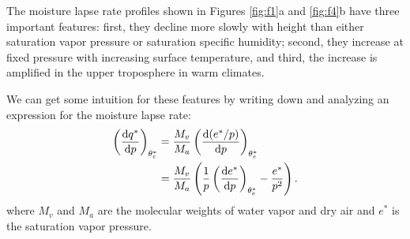 \documentclass[twocol]{ametsoc}
\begin{document}
%
%
%

\appendix[A]
\label{app:moisture_lapse_rate}

The moisture lapse rate profiles shown in Figures \ref{fig:f1}a and \ref{fig:f4}b have three important features: first, they decline more slowly with height than either saturation vapor pressure or saturation specific humidity; second, they increase at fixed pressure with increasing surface temperature, and third, the increase is amplified in the upper troposphere in warm climates.

We can get some intuition for these features by writing down and analyzing an expression for the moisture lapse rate:
\begin{equation} \label{eqn:mlrexp}
\begin{split}
	\left(\frac{{\rm d}q^*}{{\rm d}p}\right)_{\theta_e^*} &= \frac{M_v}{M_a}\left(\frac{{\rm d}(e^*/p)}{{\rm d}p}\right)_{\theta_e^*} \\
	&= \frac{M_v}{M_a} \left ( \frac{1}{p} \left(\frac{{\rm d}e^*}{{\rm d}p}\right)_{\theta_e^*} - \frac{e^*}{p^2} \right ).
\end{split}
\end{equation}
where $M_v$ and $M_a$ are the molecular weights of water vapor and dry air and $e^*$ is the saturation vapor pressure.
\end{document}
